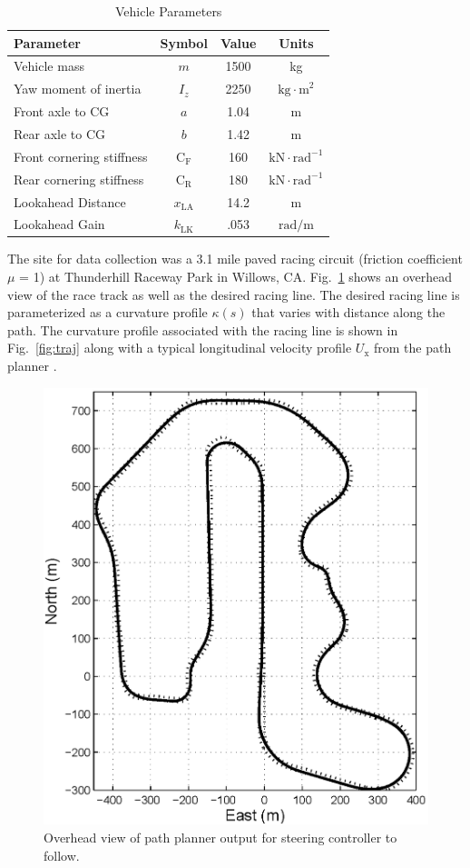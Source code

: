 \documentclass{nVSD2e}
\theoremstyle{plain}
\theoremstyle{definition}
\theoremstyle{remark}
\begin{document}
\begin{table}[h]
\small
\begin{center}
\caption{Vehicle Parameters}\label{tb:params}
\begin{tabular}{lccc}
Parameter & Symbol & Value & Units \\\hline
Vehicle mass & $m$ & 1500 & kg \\
Yaw moment of inertia & $I_z$ & 2250 & $\mathrm{kg \cdot m}^2$\\
Front axle to CG & $a$ & 1.04 & m\\
Rear axle to CG & $b$ & 1.42 & m\\
Front cornering stiffness & $\mathrm{C}_\mathrm{F}$ & 160 & $\mathrm{kN \cdot rad}^{-1}$ \\
Rear cornering stiffness & $\mathrm{C}_\mathrm{R}$ & 180 & $\mathrm{kN \cdot rad}^{-1}$ \\
Lookahead Distance		 & $x_\mathrm{LA}$         & 14.2 & $\mathrm{m}$ \\
Lookahead Gain         & $k_\mathrm{LK}$         & .053 & $\mathrm{rad/m}$ \\\hline
\end{tabular}
\end{center}
\end{table}

The site for data collection was a 3.1 mile paved racing circuit (friction coefficient $\mu$ = 1) at Thunderhill Raceway Park in Willows, CA.
Fig.~\ref{fig:thPic} shows an overhead view of the race track as well as the desired racing line. The desired racing
line is parameterized as a curvature profile $\kappa(s)$ that varies with distance along the path. The curvature
profile associated with the racing line is shown in Fig.~\ref{fig:traj}
along with a typical longitudinal velocity profile $U_\mathrm{x}$ from the path planner \cite{theodosis}.

\begin{figure}[h]
\centering
\includegraphics[width=.75\columnwidth]{figures/racingLine.eps}
\caption{Overhead view of path planner output for steering controller to follow.}
\label{fig:thPic}
\end{figure}
\end{document}
